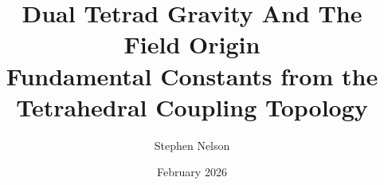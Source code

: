 \documentclass[aps,prd,preprint,superscriptaddress,showpacs,preprintnumbers,amsmath,amssymb,nofootinbib]{revtex4-2}
\begin{document}
\raggedbottom

\vspace*{3cm}

\title{Dual Tetrad Gravity And The Field Origin\\
\large Fundamental Constants from the Tetrahedral Coupling Topology}

\author{Stephen Nelson}

\date{February 2026}

\end{document}
